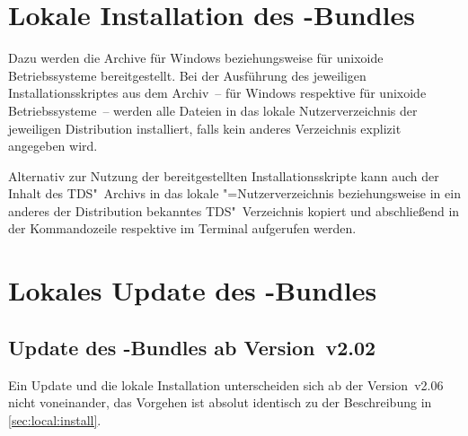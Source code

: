 \section{Lokale Installation des \TUDScript-Bundles}
%
%
%

Dazu werden die Archive  
für Windows beziehungsweise  
für unixoide Betriebssysteme bereitgestellt. Bei der Ausführung des jeweiligen 
Installationsskriptes aus dem Archiv~-- 
für Windows respektive  für unixoide 
Betriebssysteme~-- werden alle Dateien in das lokale Nutzerverzeichnis der 
jeweiligen Distribution installiert, falls kein anderes Verzeichnis explizit 
angegeben wird. 


Alternativ zur Nutzung der bereitgestellten Installationsskripte kann auch der 
Inhalt des TDS"~Archivs  in das lokale 
"=Nutzerverzeichnis beziehungsweise in ein anderes der Distribution 
bekanntes TDS"~Verzeichnis kopiert und abschließend in der Kommandozeile 
respektive im Terminal  aufgerufen werden. 



\section{Lokales Update des \TUDScript-Bundles}
%
%
\subsection{Update des \TUDScript-Bundles ab Version~v2.02}
%
Ein Update und die lokale Installation unterscheiden sich ab der Version~v2.06 
nicht voneinander, das Vorgehen ist absolut identisch zu der Beschreibung in 
\autoref{sec:local:install}.



